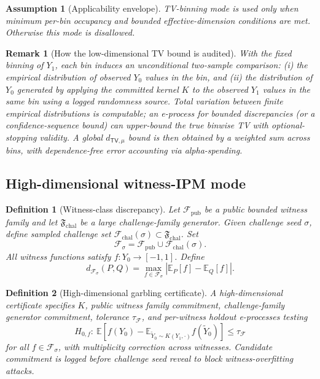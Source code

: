 \documentclass[11pt,a4paper]{article}
\newtheorem{definition}{Definition}[section]
\newtheorem{assumption}{Assumption}[section]
\newtheorem{remark}{Remark}[section]
\newcommand{\TV}{\mathsf{TV}}
\begin{document}
\begin{assumption}[Applicability envelope]
TV-binning mode is used only when minimum per-bin occupancy and bounded effective-dimension conditions are met.
Otherwise this mode is disallowed.
\end{assumption}

\begin{remark}[How the low-dimensional TV bound is audited]
With the fixed binning of $Y_1$, each bin induces an unconditional two-sample comparison:
(i) the empirical distribution of observed $Y_0$ values in the bin, and
(ii) the distribution of $Y_0$ generated by applying the committed kernel $K$ to the observed $Y_1$ values in the same bin using a logged randomness source.
Total variation between finite empirical distributions is computable; an e-process for bounded discrepancies (or a confidence-sequence bound) can upper-bound the true binwise TV with optional-stopping validity.
A global $d_{\TV,\mu}$ bound is then obtained by a weighted sum across bins, with dependence-free error accounting via alpha-spending.
\end{remark}

\subsection{High-dimensional witness-IPM mode}
\begin{definition}[Witness-class discrepancy]
Let $\mathcal{F}_{\mathrm{pub}}$ be a public bounded witness family and let $\mathfrak{F}_{\mathrm{chal}}$ be a large challenge-family generator.
Given challenge seed $\sigma$, define sampled challenge set $\mathcal{F}_{\mathrm{chal}}(\sigma)\subset\mathfrak{F}_{\mathrm{chal}}$.
Set
\[
\mathcal{F}_\sigma=\mathcal{F}_{\mathrm{pub}}\cup \mathcal{F}_{\mathrm{chal}}(\sigma).
\]
All witness functions satisfy $f:Y_0\to[-1,1]$.
Define
\[
d_{\mathcal{F}_\sigma}(P,Q)=\max_{f\in\mathcal{F}_\sigma}\left|\mathbb{E}_{P}[f]-\mathbb{E}_{Q}[f]\right|.
\]
\end{definition}

\begin{definition}[High-dimensional garbling certificate]
A high-dimensional certificate specifies $K$, public witness family commitment, challenge-family generator commitment, tolerance $\tau_{\mathcal{F}}$, and per-witness holdout e-processes testing
\[
H_{0,f}:\ \mathbb{E}\!\left[f(Y_0)-\mathbb{E}_{\tilde Y_0\sim K(Y_1,\cdot)}f(\tilde Y_0)\right]\le \tau_{\mathcal{F}}
\]
for all $f\in\mathcal{F}_\sigma$, with multiplicity correction across witnesses.
Candidate commitment is logged \emph{before} challenge seed reveal to block witness-overfitting attacks.
\end{definition}
\end{document}

